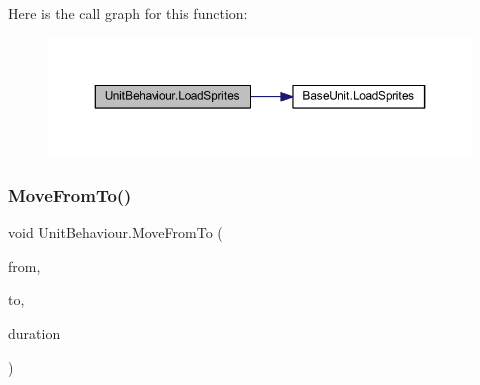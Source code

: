 Here is the call graph for this function\+:
\nopagebreak
\begin{figure}[H]
\begin{center}
\leavevmode
\includegraphics[width=350pt]{class_unit_behaviour_a544570d55168594c1e4502dbe5c9d6a8_cgraph}
\end{center}
\end{figure}
\mbox{\label{class_unit_behaviour_a46ff5685dd97f930e6e2a835e01efb4d}} 
\subsubsection{\texorpdfstring{MoveFromTo()}{MoveFromTo()}}
{\footnotesize\ttfamily void Unit\+Behaviour.\+Move\+From\+To (\begin{DoxyParamCaption}\item[{Vector2\+Int}]{from,  }\item[{Vector2\+Int}]{to,  }\item[{float}]{duration }\end{DoxyParamCaption})}

